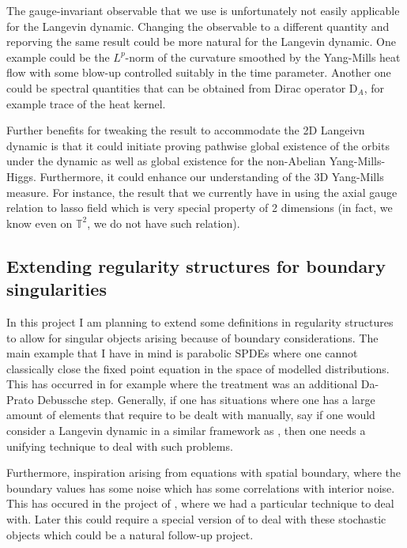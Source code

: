\documentclass[12pt]{article}
\numberwithin{equation}{section}
\theoremstyle{definition}
\theoremstyle{remark}
\newcommand{\1}{\mathbf 1}
\newcommand{\<}{\langle}
\renewcommand{\>}{\rangle}
\newcommand{\rmD}{\mathrm{D}}
\newcommand{\bT}{\mathbb T}
\begin{document}
The gauge-invariant observable that we use is unfortunately not easily applicable for the Langevin dynamic. Changing the observable to a different quantity and reporving the same result could be more natural for the Langevin dynamic. One example could be the $L^p$-norm of the curvature smoothed by the Yang-Mills heat flow with some blow-up controlled suitably in the time parameter. Another one could be spectral quantities that can be obtained from Dirac operator $\rmD_A$, for example trace of the heat kernel. 

Further benefits for tweaking the result to accommodate the 2D Langeivn dynamic is that it could initiate proving pathwise global existence of the orbits under the dynamic as well as global existence for the non-Abelian Yang-Mills-Higgs. Furthermore,  it could enhance our understanding of the 3D Yang-Mills measure. For instance, the result that we currently have in  using the axial gauge relation to lasso field which is very special property of 2 dimensions (in fact, we know even on $\bT^2$, we do not have such relation).  


\subsection{Extending regularity structures for boundary singularities}
In this project I am planning to extend some definitions in regularity structures \cite{Hairer14} to allow for singular objects arising because of boundary considerations. The main example that I have in mind is parabolic SPDEs where one cannot classically close the fixed point equation in the space of modelled distributions. This has occurred in \cite{CCHS3d} for example where the treatment was an additional Da-Prato Debussche step. Generally, if one has situations where one has a large amount of elements that require to be dealt with manually, say if one would consider a Langevin dynamic in a similar framework as  \cite{CM24}, then one needs a unifying technique to deal with such problems. 

Furthermore, inspiration arising from equations with spatial boundary, where the boundary values has some noise which has some correlations with interior noise. This has occured in the project of , where we had a particular technique to deal with. Later this could require a special version of \cite{CH16} to deal with these stochastic objects which could be a natural follow-up project. 
\end{document}
